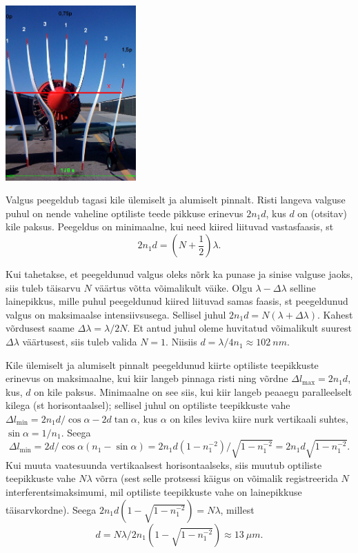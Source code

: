 \documentclass[10pt]{article}
\begin{document}
{\begin{center}
	\includegraphics[width=50mm]{2010-v3g-10-Propeller3.jpg}
\end{center}
\probend
\bigskip


\solu
Valgus peegeldub tagasi kile ülemiselt ja alumiselt pinnalt. Risti langeva valguse puhul on nende vaheline optiliste teede pikkuse erinevus $2n_1d$, kus $d$ on (otsitav) kile paksus. Peegeldus on minimaalne, kui need kiired liituvad vastasfaasis, st
\[
2n_1d = \left( N + \frac 12 \right)\lambda.
\]

Kui tahetakse, et peegeldunud valgus oleks nõrk ka punase ja sinise valguse jaoks, siis tuleb täisarvu $N$ väärtus võtta võimalikult väike. Olgu $\lambda - \Delta \lambda $ selline lainepikkus, mille puhul peegeldunud kiired liituvad samas faasis, st peegeldunud valgus on maksimaalse intensiivsusega. Sellisel juhul $2n_1d = N(\lambda + \Delta \lambda )$. Kahest võrdusest saame $\Delta \lambda = \lambda /2N$. Et antud juhul oleme huvitatud võimalikult suurest $\Delta \lambda$ väärtusest, siis tuleb valida $N = 1$. Niisiis $d = \lambda /4n_1 \approx \SI{102}{nm}$.
\probend
\bigskip


\solu
Kile ülemiselt ja alumiselt pinnalt peegeldunud kiirte optiliste teepikkuste erinevus on maksimaalne, kui
kiir langeb pinnaga risti ning võrdne $\Delta l_{\max}=2n_1d$, kus, $d$ on kile paksus. Minimaalne on see siis, kui kiir langeb peaaegu paralleelselt kilega (st horisontaalsel); sellisel juhul on optiliste teepikkuste vahe $\Delta l_{\min}=2n_1d/\cos\alpha-2d\tan\alpha$, kus $\alpha$ on kiles leviva kiire nurk vertikaali suhtes, $\sin\alpha=1/n_1$. Seega 
\[
\Delta l_{\min}=2d/\cos\alpha(n_1-\sin\alpha)=2n_1d(1-n_1^{-2})/\sqrt{1-n_1^{-2}}=2n_1d\sqrt{1-n_1^{-2}}.
\]
Kui muuta vaatesuunda vertikaalsest horisontaalseks, siis muutub optiliste teepikkuste vahe $N\lambda$ võrra (sest selle protsessi käigus on võimalik registreerida $N$ interferentsimaksimumi, mil optiliste teepikkuste vahe on lainepikkuse täisarvkordne). Seega
$2n_1d(1-\sqrt{1-n_1^{-2}})=N\lambda$, millest $$d=N\lambda/2n_1(1-\sqrt{1-n_1^{-2}})\approx \SI{13}{\mu m}.$$
\probend
\bigskip

}
\end{document}
